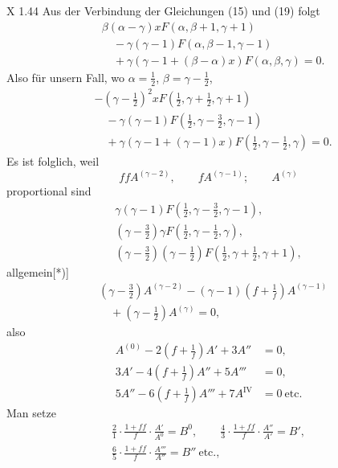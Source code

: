 \par\medskip\noindent X 1.\hfill 44
\clearpage{}
Aus der Verbindung der Gleichungen (15) und (19) folgt
\[
\begin{aligned}
&\beta(\alpha-\gamma)xF(\alpha,\beta+1,\gamma+1)\\
&\quad-\gamma(\gamma-1)F(\alpha,\beta-1,\gamma-1)\\
&\quad+\gamma(\gamma-1+(\beta-\alpha)x)F(\alpha,\beta,\gamma)=0.
\end{aligned}
\]
\noindent Also für unsern Fall, wo $\alpha=\frac12$, $\beta=\gamma-\frac12$,
\[
\begin{aligned}
&-\left(\gamma-\frac12\right)^2xF\left(\frac12,\gamma+\frac12,\gamma+1\right)\\
&\quad-\gamma(\gamma-1)F\left(\frac12,\gamma-\frac32,\gamma-1\right)\\
&\quad+\gamma(\gamma-1+(\gamma-1)x)F\left(\frac12,\gamma-\frac12,\gamma\right)=0.
\end{aligned}
\]
\noindent Es ist folglich, weil
\[ffA^{(\gamma-2)},\qquad fA^{(\gamma-1)};\qquad A^{(\gamma)}\]
\noindent proportional sind
\[
\begin{gathered}
\gamma(\gamma-1)F\left(\frac12,\gamma-\frac32,\gamma-1\right),\\
\left(\gamma-\frac32\right)\gamma F\left(\frac12,\gamma-\frac12,\gamma\right),\\
\left(\gamma-\frac32\right)\left(\gamma-\frac12\right)F\left(\frac12,\gamma+\frac12,\gamma+1\right),
\end{gathered}
\]
\noindent allgemein[*)]
\begin{equation}
\begin{aligned}
&\left(\gamma-\frac32\right)A^{(\gamma-2)}-(\gamma-1)\left(f+\frac1f\right)A^{(\gamma-1)}\\
&\quad+\left(\gamma-\frac12\right)A^{(\gamma)}=0,
\end{aligned}\tag*{(43)}
\end{equation}
\noindent also
\[
\begin{aligned}
A^{(0)}-2\left(f+\frac1f\right)A'+3A''&=0,\\
3A'-4\left(f+\frac1f\right)A''+5A'''&=0,\\
5A''-6\left(f+\frac1f\right)A'''+7A^{\mathrm{IV}}&=0\ \mathrm{etc.}
\end{aligned}
\]
\noindent Man setze
\begin{equation}
\begin{gathered}
\frac21\cdot\frac{1+ff}{f}\cdot\frac{A'}{A^0}=B^0,\qquad
\frac43\cdot\frac{1+ff}{f}\cdot\frac{A''}{A'}=B',\\
\frac65\cdot\frac{1+ff}{f}\cdot\frac{A'''}{A''}=B''\ \mathrm{etc.},
\end{gathered}\tag*{(44)}
\end{equation}
